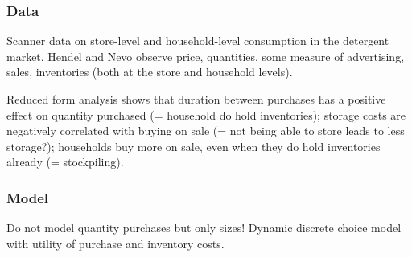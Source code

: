 \subsubsection{Data}

Scanner data on store-level and household-level consumption in the detergent market. Hendel and Nevo observe price, quantities, some measure of advertising, sales, inventories (both at the store and household levels).

Reduced form analysis shows that duration between purchases has a positive effect on quantity purchased (= household do hold inventories); storage costs are negatively correlated with buying on sale (= not being able to store leads to less storage?); households buy more on sale, even when they do hold inventories already (= stockpiling).

\subsubsection{Model}

Do not model quantity purchases but only sizes! Dynamic discrete choice model with utility of purchase and inventory costs.